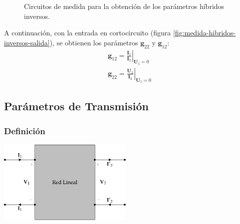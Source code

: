 \begin{figure}[H]
  \centering
  \hspace{2cm}
\caption{Circuitos de medida para la obtención de los parámetros híbridos inversos.}
  \label{fig:medida-hibridos-inversos}
\end{figure}


A continuación, con la entrada en cortocircuito (figura \ref{fig:medida-hibridos-inversos-salida}), se obtienen los parámetros $\mathbf{g}_{22}$ y $\mathbf{g}_{12}$:
\[
  \begin{array}{c}
    \mathbf{g}_{12} = \left.\frac{\mathbf{I}_1}{\mathbf{I}_2}\right\rvert_{\mathbf{U}_1 = 0}\\
    \mathbf{g}_{22} = \left.\frac{\mathbf{U}_2}{\mathbf{I}_2}\right\rvert_{\mathbf{U}_1 = 0}
  \end{array}
\]


\subsection{Parámetros de Transmisión}
\label{sec:orgd5598b8}

\subsubsection{Definición}
\label{sec:orgcd755d3}

\includegraphics[height=4cm]{../figs/cuadripolo_transmision.pdf}


